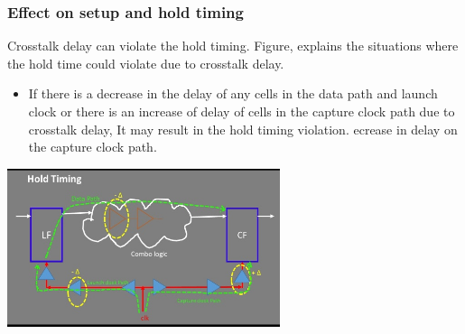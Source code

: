 \documentclass{beamer}
\begin{document}
\begin{frame}
	\frametitle{Effect on setup and hold timing}
	Crosstalk delay can violate the hold timing. Figure, explains the situations where the hold time could violate due to crosstalk delay. 
	\begin{itemize}
		\item If there is a decrease in the delay of any cells in the data path and launch clock or there is an increase of delay of cells in the capture clock path due to crosstalk delay, It may result in the hold timing violation. ecrease in delay on the capture clock path.  
	\end{itemize}
	\begin{center}
		\includegraphics[width=0.6\textwidth]{hold}
	\end{center}
\end{frame}	
\end{document}

